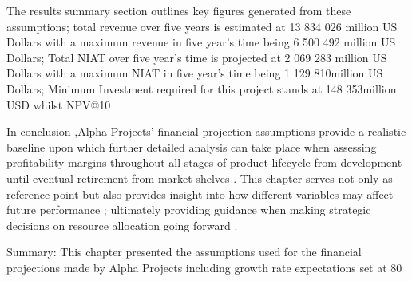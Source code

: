 The results summary section outlines key figures generated from these assumptions; total revenue over five years is estimated at 13 834 026 million US Dollars with a maximum revenue in five year's time being 6 500 492 million US Dollars; Total NIAT over five year's time is projected at 2 069 283 million US Dollars with a maximum NIAT in five year's time being 1 129 810million US Dollars; Minimum Investment required for this project stands at 148 353million USD whilst NPV@10 %

In conclusion ,Alpha Projects' financial projection assumptions provide a realistic baseline upon which further detailed analysis can take place when assessing profitability margins throughout all stages of product lifecycle from development until eventual retirement from market shelves . This chapter serves not only as reference point but also provides insight into how different variables may affect future performance ; ultimately providing guidance when making strategic decisions on resource allocation going forward . 

Summary: This chapter presented the assumptions used for the financial projections made by Alpha Projects including growth rate expectations set at 80%